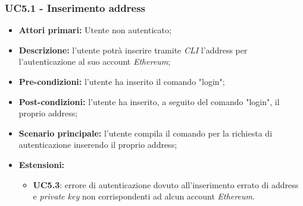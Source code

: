 \subsubsection{UC5.1 - Inserimento address}
\begin{itemize}
	\item \textbf{Attori primari:} Utente non autenticato;
	\item \textbf{Descrizione:} l'utente potrà inserire tramite \textit{CLI\glo} l'address per l'autenticazione al suo account \textit{Ethereum\glos}; 
	\item \textbf{Pre-condizioni:} l'utente ha inserito il comando "login";
	\item \textbf{Post-condizioni:} l'utente ha inserito, a seguito del comando "login", il proprio address;
	\item \textbf{Scenario principale:} l'utente compila il comando per la richiesta di autenticazione inserendo il proprio address;
	\item \textbf{Estensioni:} 
	\begin{itemize}
		\item \textbf{UC5.3}: errore di autenticazione dovuto all'inserimento errato di address e \textit{private key\glo} non corrispondenti ad alcun account \textit{Ethereum\glos}.
	\end{itemize}
\end{itemize}